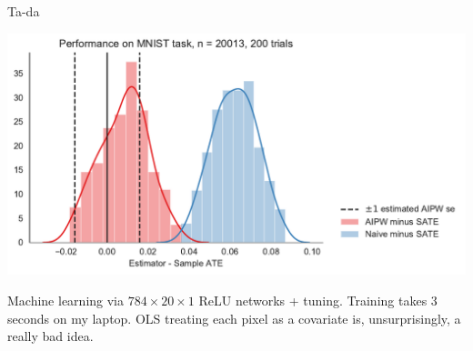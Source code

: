 \documentclass[10pt,aspectratio=169,handout]{beamer}
\theoremstyle{definition}
\begin{document}
\begin{frame}{Ta-da}
  \begin{center}
    \includegraphics[height=.8\textheight]{mnist.pdf}
  \end{center}
  \scriptsize
  Machine learning via $784 \times 20 \times 1$ ReLU networks + tuning.
  Training takes 3 seconds on my laptop. OLS treating each pixel as a
  covariate is, unsurprisingly, a really bad idea. 
\end{frame}


% 
% 
\end{document}
